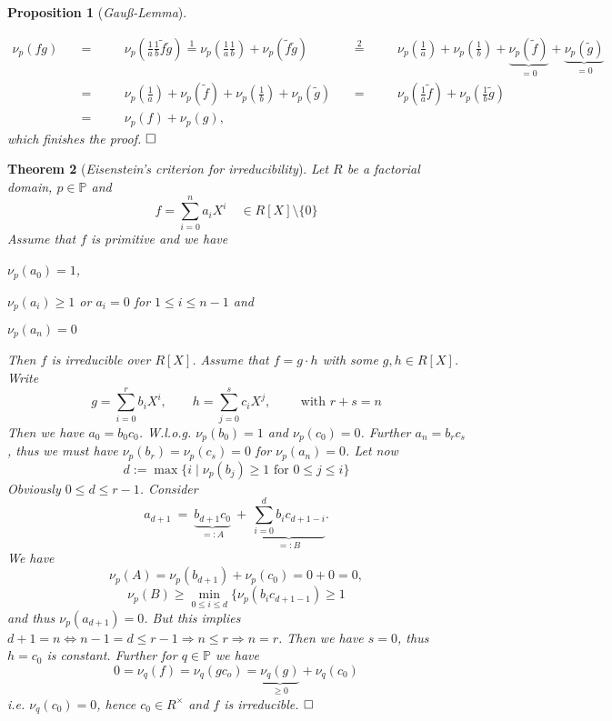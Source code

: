 \documentclass[11pt]{book}
\newtheorem{theorem}{Theorem}[section]
\newtheorem{proposition}[theorem]{Proposition}
\theoremstyle{nonumberbreak}
\newenvironment{pr}[1][]{\ifthenelse{\equal{#1}{}}{\proof}{\proof[#1]}\rm}{\endproof}
\begin{document}
\begin{spacing}{1.3}
\begin{proposition}[\rm \it Gauß-Lemma]
\begin{pr}
\begin{compactitem}
\begin{alignat*}{8}
\nu_p(fg)\quad&=&&\quad \nu_p\left(\frac{1}{a}\frac{1}{b} \tilde{f} \tilde{g}\right) \overset{1}{=}\nu_p\left(\frac{1}{a} \frac{1}{b}\right) + \nu_p(\tilde{f} \tilde{g}) \ &&\overset{2}{=}&& \quad \nu_p\left(\frac{1}{a}\right)+ \nu_p\left(\frac{1}{b}\right)+ \underbrace{\nu_p(\tilde{f})}_{=0}+ \underbrace{\nu_p(\tilde{g})}_{=0}\\
&=&& \quad \nu_p\left(\frac{1}{a}\right)+\nu_p(\tilde{f})+ \nu_p\left(\frac{1}{b}\right)+ \nu_p(\tilde{g}) \ &&=&& \quad \nu_p\left(\frac{1}{a} \tilde{f}\right)+ \nu_p \left(\frac{1}{b} \tilde{g}\right)\\
&=&&  \quad\nu_p(f) + \nu_p(g),
\end{alignat*}
which finishes the proof. $\hfill \Box$
\end{compactitem}
\end{pr}
\end{proposition}

\begin{theorem}[\rm \it Eisenstein's criterion for irreducibility]
Let $R$ be a factorial domain, $p \in \mathbb{P}$ and $$f= \sum_{i=0}^n a_i X^{i} \quad \in R[X]\setminus \{0\}$$
Assume that $f$ is primitive and we have
\begin{compactenum}
\item $\nu_p(a_0)=1$,
\item $\nu_p(a_i)\geqslant 1 $ or $a_i=0$ for $1 \leqslant i \leqslant n-1$ and
\item $\nu_p(a_n)=0$
\end{compactenum}
Then $f$ is irreducible over $R[X]$.
\begin{pr}
Assume that $f=g\cdot h$ with some $g,h \in R[X]$. Write 
$$g= \sum_{i=0}^r b_i X^{i}, \qquad h=\sum_{j=0}^s c_i X^{j}, \qquad \textrm{ with } r+s=n$$
Then we have $a_0=b_0c_0$. W.l.o.g. $\nu_p(b_0)=1$ and $\nu_p(c_0)=0$.
Further $a_n=b_r c_s$, thus we must have $\nu_p(b_r)=\nu_p(c_s)=0$ for $\nu_p(a_n)=0$.
Let now $$d:=\max\{i \mid \nu_p(b_j) \geqslant 1 \textrm{ for } 0 \leqslant j \leqslant i \}$$
Obviously $0 \leqslant d \leqslant r-1$. Consider
$$a_{d+1}\ =\ \underbrace{b_{d+1}c_0}_{=:A}\ +\ \underbrace{\sum_{i=0}^d b_i c_{d+1-i}}_{=:B}.$$
We have 
$$\nu_p(A)=\nu_p(b_{d+1})+\nu_p(c_0)=0+0=0,$$
$$\nu_p(B) \geqslant \min_{0 \leqslant i \leqslant d}\{\nu_p(b_ic_{d+1-1})\geqslant 1$$
and thus $\nu_p(a_{d+1})=0$. But this implies $d+1=n \Leftrightarrow n-1 =d \leqslant r-1 \Rightarrow n\leqslant r \Rightarrow n=r$.
Then we have $s=0$, thus $h=c_0$ is constant. Further for $q \in \mathbb{P}$ we have
$$0=\nu_q(f)=\nu_q(gc_o)=\underbrace{\nu_q(g)}_{\geqslant 0}+\nu_q(c_0)$$
i.e. $\nu_q(c_0)=0$, hence $c_0 \in R^{\times}$ and $f$ is irreducible. $\hfill \Box$
\end{pr}
\end{theorem}


\end{spacing}
\end{document}
